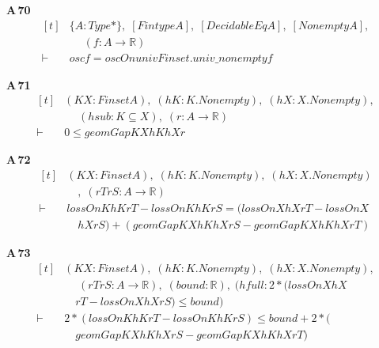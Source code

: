 \noindent\textbf{A\,70}\quad{}
{\footnotesize\[ \begin{aligned}[t]
&\{ \mathit{A} : \mathit{Type}*\},\; [\mathit{Fintype} \mathit{A}],\; [\mathit{DecidableEq} \mathit{A}],\; [\mathit{Nonempty} \mathit{A}],\\
&\quad \; (\mathit{f} : \mathit{A} \to \mathbb{R} )\\
\vdash\;&\mathit{osc} \mathit{f} = \mathit{oscOn} \mathit{univ} \mathit{Finset}.\mathit{univ\_nonempty} \mathit{f}
\end{aligned} \]}

\noindent\textbf{A\,71}\quad{}
{\footnotesize\[ \begin{aligned}[t]
&(\mathit{K} \mathit{X} : \mathit{Finset} \mathit{A}),\; (\mathit{hK} : \mathit{K}.\mathit{Nonempty}),\; (\mathit{hX} : \mathit{X}.\mathit{Nonempty}),\\
&\quad \; (\mathit{hsub} : \mathit{K} \subseteq \mathit{X}),\; (\mathit{r} : \mathit{A} \to \mathbb{R} )\\
\vdash\;&0 \leq \mathit{geomGap} \mathit{K} \mathit{X} \mathit{hK} \mathit{hX} \mathit{r}
\end{aligned} \]}

\noindent\textbf{A\,72}\quad{}
{\footnotesize\[ \begin{aligned}[t]
&(\mathit{K} \mathit{X} : \mathit{Finset} \mathit{A}),\; (\mathit{hK} : \mathit{K}.\mathit{Nonempty}),\; (\mathit{hX} : \mathit{X}.\mathit{Nonempty})\\
&\quad ,\; (\mathit{rT} \mathit{rS} : \mathit{A} \to \mathbb{R} )\\
\vdash\;&\mathit{lossOn} \mathit{K} \mathit{hK} \mathit{rT} - \mathit{lossOn} \mathit{K} \mathit{hK} \mathit{rS} = (\mathit{lossOn} \mathit{X} \mathit{hX} \mathit{rT} - \mathit{lossOn} \mathit{X}\\
&\quad \mathit{hX} \mathit{rS}) + (\mathit{geomGap} \mathit{K} \mathit{X} \mathit{hK} \mathit{hX} \mathit{rS} - \mathit{geomGap} \mathit{K} \mathit{X} \mathit{hK} \mathit{hX} \mathit{rT})
\end{aligned} \]}

\noindent\textbf{A\,73}\quad{}
{\footnotesize\[ \begin{aligned}[t]
&(\mathit{K} \mathit{X} : \mathit{Finset} \mathit{A}),\; (\mathit{hK} : \mathit{K}.\mathit{Nonempty}),\; (\mathit{hX} : \mathit{X}.\mathit{Nonempty}),\\
&\quad \; (\mathit{rT} \mathit{rS} : \mathit{A} \to \mathbb{R} ),\; (\mathit{bound} : \mathbb{R} ),\; (\mathit{hfull} : 2 * (\mathit{lossOn} \mathit{X} \mathit{hX}\\
&\quad \mathit{rT} - \mathit{lossOn} \mathit{X} \mathit{hX} \mathit{rS}) \leq \mathit{bound})\\
\vdash\;&2 * (\mathit{lossOn} \mathit{K} \mathit{hK} \mathit{rT} - \mathit{lossOn} \mathit{K} \mathit{hK} \mathit{rS}) \leq \mathit{bound} + 2 * (\\
&\quad \mathit{geomGap} \mathit{K} \mathit{X} \mathit{hK} \mathit{hX} \mathit{rS} - \mathit{geomGap} \mathit{K} \mathit{X} \mathit{hK} \mathit{hX} \mathit{rT})
\end{aligned} \]}

